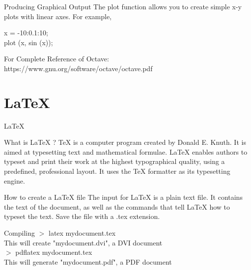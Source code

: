 \documentclass[pdf]{beamer}
\begin{document}
\begin{frame}
\begin{block}{Producing Graphical Output}
The plot function allows you to create simple x-y plots with linear axes. For example,
\begin{example}
x = -10:0.1:10; \\
plot (x, sin (x));
\end{example}
\end{block}

\begin{block}{}
For Complete Reference of Octave:
https://www.gnu.org/software/octave/octave.pdf
\end{block}

\end{frame}

\section{\LaTeX{}}

\begin{frame}{\LaTeX{}}
	\begin{block}{What is \LaTeX{} ?}
	\TeX{} is a computer program created by Donald E. Knuth. It is aimed at typesetting text and mathematical formulae. \LaTeX{} enables authors to typeset and print their work at the highest typographical quality, using a predefined, professional layout. It uses the \TeX{} formatter as its typesetting engine.
	\end{block}
\end{frame}

\begin{frame}
\begin{block}{How to create a \LaTeX{} file}
The input for \LaTeX{} is a plain text file. It contains the text of the document, as well as the commands that tell \LaTeX{} how to typeset the text. Save the file with a .tex extension.
\end{block}

\begin{block}{Compiling}
$>$ latex mydocument.tex \\
This will create "mydocument.dvi", a DVI document \\
$>$ pdflatex mydocument.tex \\
This will generate "mydocument.pdf", a PDF document
\end{block}

\end{frame}
\end{document}
